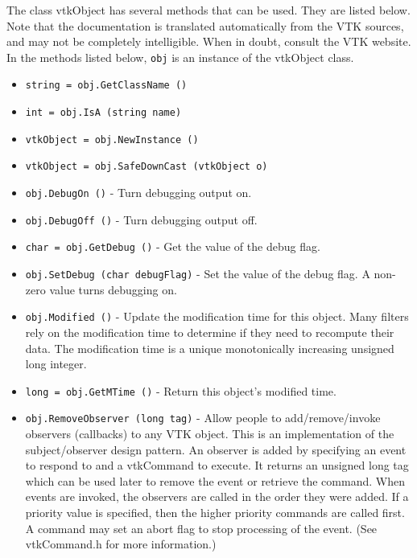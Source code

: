 The class vtkObject has several methods that can be used.
  They are listed below.
Note that the documentation is translated automatically from the VTK sources,
and may not be completely intelligible.  When in doubt, consult the VTK website.
In the methods listed below, \verb|obj| is an instance of the vtkObject class.
\begin{itemize}
\item  \verb|string = obj.GetClassName ()|

\item  \verb|int = obj.IsA (string name)|

\item  \verb|vtkObject = obj.NewInstance ()|

\item  \verb|vtkObject = obj.SafeDownCast (vtkObject o)|

\item  \verb|obj.DebugOn ()| -  Turn debugging output on.

\item  \verb|obj.DebugOff ()| -  Turn debugging output off.

\item  \verb|char = obj.GetDebug ()| -  Get the value of the debug flag.

\item  \verb|obj.SetDebug (char debugFlag)| -  Set the value of the debug flag. A non-zero value turns debugging on.

\item  \verb|obj.Modified ()| -  Update the modification time for this object. Many filters rely on
 the modification time to determine if they need to recompute their
 data. The modification time is a unique monotonically increasing
 unsigned long integer.

\item  \verb|long = obj.GetMTime ()| -  Return this object's modified time.

\item  \verb|obj.RemoveObserver (long tag)| -  Allow people to add/remove/invoke observers (callbacks) to any VTK
 object.  This is an implementation of the subject/observer design
 pattern. An observer is added by specifying an event to respond to
 and a vtkCommand to execute. It returns an unsigned long tag which
 can be used later to remove the event or retrieve the command.
 When events are invoked, the observers are called in the order they
 were added. If a priority value is specified, then the higher 
 priority commands are called first. A command may set an abort
 flag to stop processing of the event. (See vtkCommand.h for more
 information.)


\end{itemize}
